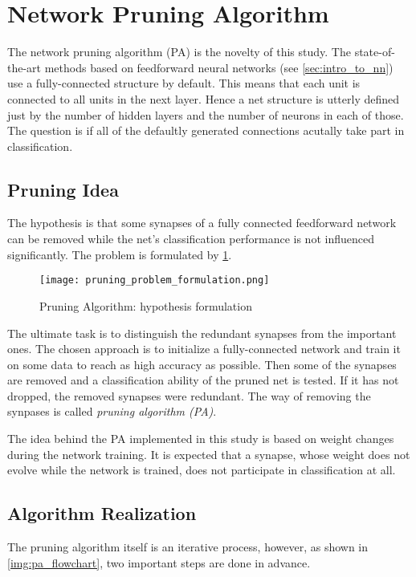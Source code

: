 \newpage
\section{Network Pruning Algorithm} \label{sec:network_pruning_algorithm}
The network pruning algorithm (PA) is the novelty of this study. The state-of-the-art methods based on feedforward neural networks (see \cref{sec:intro_to_nn}) use a fully-connected structure by default. This means that each unit is connected to all units in the next layer. Hence a net structure is utterly defined just by the number of hidden layers and the number of neurons in each of those. The question is if all of the defaultly generated connections acutally take part in classification.

\subsection{Pruning Idea} \label{ssec:pa_idea}
The hypothesis is that some synapses of a fully connected feedforward network can be removed while the net's classification performance is not influenced significantly.  The problem is formulated by \cref{img:pruning_problem_formulation}.

\begin{figure}[H]
  \centering
  \texttt{[image: pruning\_problem\_formulation.png]}
  \caption{Pruning Algorithm: hypothesis formulation}
  \label{img:pruning_problem_formulation}
\end{figure}

The ultimate task is to distinguish the redundant synapses from the important ones. The chosen approach is to initialize a fully-connected network and train it on some data to reach as high accuracy as possible. Then some of the synapses are removed and a classification ability of the pruned net is tested. If it has not dropped, the removed synapses were redundant. The way of removing the synpases is called \textit{pruning algorithm (PA)}.

The idea behind the PA implemented in this study is based on weight changes during the network training. It is expected that a synapse, whose weight does not evolve while the network is trained, does not participate in classification at all. 

\subsection{Algorithm Realization} \label{ssec:pa_realization}
The pruning algorithm itself is an iterative process, however, as shown in \cref{img:pa_flowchart}, two important steps are done in advance.

